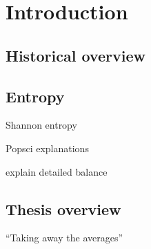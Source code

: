 \chapter{Introduction}

\section{Historical overview}




\section{Entropy}

Shannon entropy

Popsci explanations

explain detailed balance


\section{Thesis overview}

``Taking away the averages''

